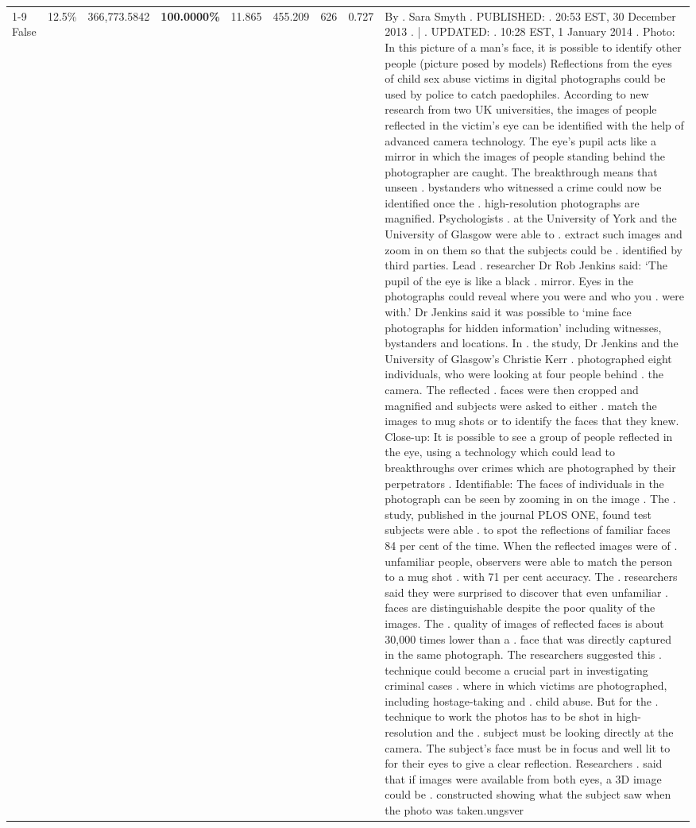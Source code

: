\begin{table}[H]
\begin{tabular}{lllrlllll}
\cline{1-9}
False & 12.5\% & 366,773.5842 & \bfseries \color{red} 100.0000\% & 11.865 & 455.209 & 626 & 0.727 & By . Sara Smyth . PUBLISHED: . 20:53 EST, 30 December 2013 . | . UPDATED: . 10:28 EST, 1 January 2014 . Photo: In this picture of a man's face, it is possible to identify other people (picture posed by models) Reflections from the eyes of child sex abuse victims in digital photographs could be used by police to catch paedophiles. According to new research from two UK universities, the images of people reflected in the victim's eye can be identified with the help of advanced camera technology. The eye's pupil acts like a mirror in which the images of people standing behind the photographer are caught. The breakthrough means that unseen . bystanders who witnessed a crime could now be identified once the . high-resolution photographs are magnified. Psychologists . at the University of York and the University of Glasgow were able to . extract such images and zoom in on them so that the subjects could be . identified by third parties. Lead . researcher Dr Rob Jenkins said: ‘The pupil of the eye is like a black . mirror. Eyes in the photographs could reveal where you were and who you . were with.' Dr Jenkins said it was possible to ‘mine face photographs for hidden information' including witnesses, bystanders and locations. In . the study, Dr Jenkins and the University of Glasgow's Christie Kerr . photographed eight individuals, who were looking at four people behind . the camera. The reflected . faces were then cropped and magnified and subjects were asked to either . match the images to mug shots or to identify the faces that they knew. Close-up: It is possible to see a group of people reflected in the eye, using a technology which could lead to breakthroughs over crimes which are photographed by their perpetrators . Identifiable: The faces of individuals in the photograph can be seen by zooming in on the image . The . study, published in the journal PLOS ONE, found test subjects were able . to spot the reflections of familiar faces 84 per cent of the time. When the reflected images were of . unfamiliar people, observers were able to match the person to a mug shot . with 71 per cent accuracy. The . researchers said they were surprised to discover that even unfamiliar . faces are distinguishable despite the poor quality of the images. The . quality of images of reflected faces is about 30,000 times lower than a . face that was directly captured in the same photograph. The researchers suggested this . technique could become a crucial part in investigating criminal cases . where in which victims are photographed, including hostage-taking and . child abuse. But for the . technique to work the photos has to be shot in high-resolution and the . subject must be looking directly at the camera. The subject's face must be in focus and well lit to for their eyes to give a clear reflection. Researchers . said that if images were available from both eyes, a 3D image could be . constructed showing what the subject saw when the photo was taken.ungsver \\

\end{tabular}
\end{table}

